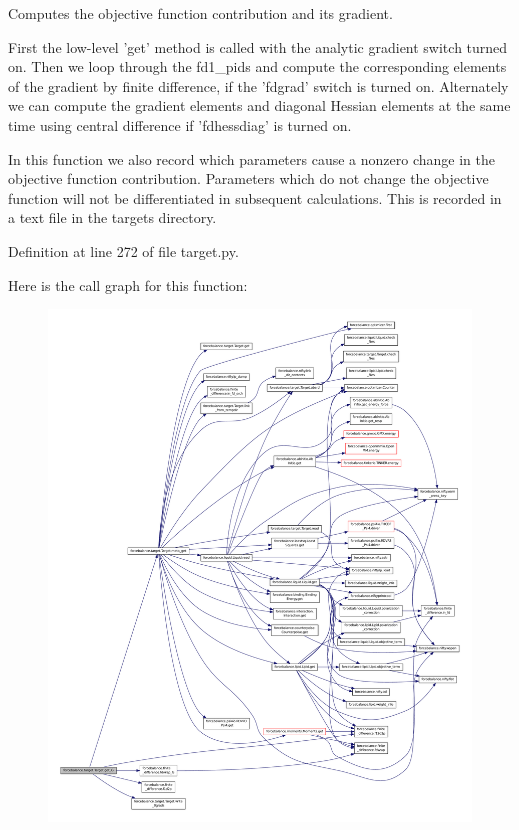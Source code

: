 Computes the objective function contribution and its gradient. 

First the low-\/level 'get' method is called with the analytic gradient switch turned on. Then we loop through the fd1\-\_\-pids and compute the corresponding elements of the gradient by finite difference, if the 'fdgrad' switch is turned on. Alternately we can compute the gradient elements and diagonal Hessian elements at the same time using central difference if 'fdhessdiag' is turned on.

In this function we also record which parameters cause a nonzero change in the objective function contribution. Parameters which do not change the objective function will not be differentiated in subsequent calculations. This is recorded in a text file in the targets directory. 

Definition at line 272 of file target.\-py.



Here is the call graph for this function\-:
\nopagebreak
\begin{figure}[H]
\begin{center}
\leavevmode
\includegraphics[width=350pt]{classforcebalance_1_1target_1_1Target_afa8cc38c8bba8861c072e789717aa049_cgraph}
\end{center}
\end{figure}


